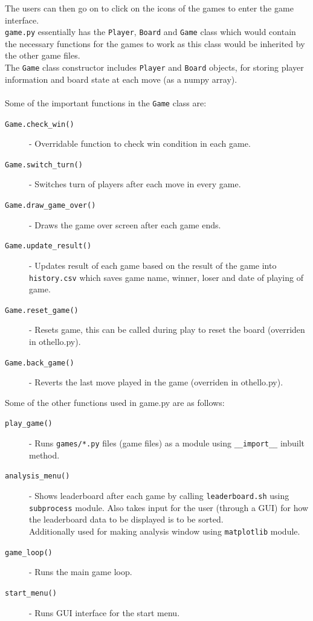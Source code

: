 \documentclass{article}
\begin{document}
The users can then go on to click on the icons of the games to enter the game interface.
\\
\texttt{game.py} essentially has the \texttt{Player}, \texttt{Board} and \texttt{Game} class which would contain the necessary functions for the games to work as this class would be inherited by the other game files.
\\
The \texttt{Game} class constructor includes \texttt{Player} and \texttt{Board} objects, for storing player information and board state at each move (as a numpy array).
\\
\\
Some of the important functions in the \texttt{Game} class are:
\begin{description}
    \item[\texttt{Game.check\_win()}]
    - Overridable function to check win condition in each game.

    \item[\texttt{Game.switch\_turn()}]
    - Switches turn of players after each move in every game.

    \item[\texttt{Game.draw\_game\_over()}]
    - Draws the game over screen after each game ends.

    \item[\texttt{Game.update\_result()}]
    - Updates result of each game based on the result of the game into \texttt{history.csv} which saves game name, winner, loser and date of playing of game.

    \item[\texttt{Game.reset\_game()}]
    - Resets game, this can be called during play to reset the board (overriden in othello.py).

    \item[\texttt{Game.back\_game()}]
    - Reverts the last move played in the game (overriden in othello.py).
\end{description}

Some of the other functions used in game.py are as follows:
\begin{description}
    \item[\texttt{play\_game()}] - Runs \texttt{games/*.py} files (game files) as a module using \texttt{\_\_import\_\_} inbuilt method.
    \item[\texttt{analysis\_menu()}] - Shows leaderboard after each game by calling \texttt{leaderboard.sh} using \texttt{subprocess} module. Also takes input for the user (through a GUI) for how the leaderboard data to be displayed is to be sorted.
    \\
    Additionally used for making analysis window using \texttt{matplotlib} module.
    \item[\texttt{game\_loop()}] - Runs the main game loop.
    \item[\texttt{start\_menu()}] - Runs GUI interface for the start menu.
\end{description}
\end{document}
